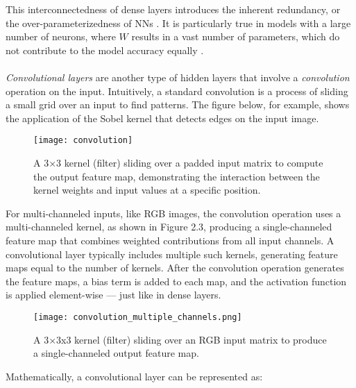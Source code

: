 \noindent This interconnectedness of dense layers introduces the inherent redundancy, 
or the over-parameterizedness of NNs \cite{gholami2021survey}. It is particularly true in models with a large number of neurons, 
where \( W \) results in a vast number of parameters, which do not contribute to the model accuracy equally \cite{hubara2016qnn}.
\\
\\
\noindent \textit{Convolutional layers} are another type of hidden layers 
that involve a \textit{convolution} operation on the input. Intuitively, a standard convolution is 
a process of sliding a small grid over an input to find patterns. The figure below, for example, shows 
the application of the Sobel kernel that detects edges on the input image.

\begin{figure}[h!]
  \centering
  \texttt{[image: convolution]}
  \caption{A 3×3 kernel (filter) sliding over a padded input matrix to compute the output feature map, demonstrating the interaction between the kernel weights and input values at a specific position.}
  \label{fig:convolution}
\end{figure}

\noindent For multi-channeled inputs, like RGB images, the convolution operation uses a multi-channeled kernel, as shown in Figure 2.3, 
producing a single-channeled feature map that combines weighted contributions from all input channels. 
A convolutional layer typically includes multiple such kernels, generating feature maps equal to the number of kernels.
After the convolution operation generates the feature maps, a bias term is added to each map, 
and the activation function is applied element-wise — just like in dense layers.

\begin{figure}[h!]
  \centering
  \texttt{[image: convolution\_multiple\_channels.png]}
  \caption{A 3×3x3 kernel (filter) sliding over an RGB input matrix to produce a single-channeled output feature map.}
  \label{fig:convolution_multiple_channels}
\end{figure}

\noindent Mathematically, a convolutional layer can be represented as:


